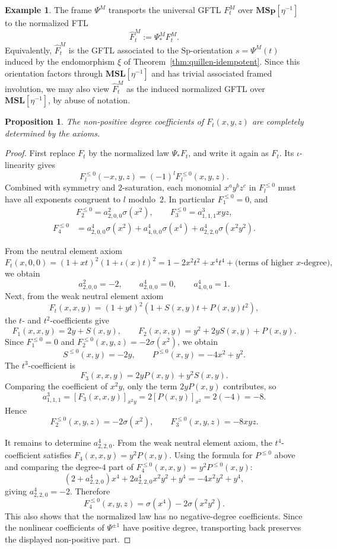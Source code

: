 \documentclass[a4paper]{amsart}
\theoremstyle{plain}
\newtheorem{proposition}[subsubsection]{Proposition}
\theoremstyle{definition}
\newtheorem{example}[subsubsection]{Example}
\newcommand{\Sp}{\mathrm{Sp}}
\newcommand{\MSp}{\mathbf{MSp}}
\newcommand{\MSL}{\mathbf{MSL}}
\newcommand{\etainv}{\eta^{-1}}
\newcommand{\MSpetainv}{{\MSp[\etainv]}}
\newcommand{\MSLetainv}{{\MSL[\etainv]}}
\renewcommand{\le}{\leqslant}
\begin{document}
\begin{example}
	The frame $\Psi^M$ transports the universal GFTL $F^M_t$ over $\MSpetainv$ to the normalized FTL
	\[
		\widehat{F}^M_t:=\Psi^M_*F^M_t.
	\]
	Equivalently, $\widehat{F}^M_t$ is the GFTL associated to the $\Sp$-orientation $s=\Psi^M(t)$ induced by the endomorphism $\xi$ of Theorem~\ref{thm:quillen-idempotent}. Since this orientation factors through $\MSLetainv$ and has trivial associated framed involution, we may also view $\widehat{F}^M_t$ as the induced normalized GFTL over $\MSLetainv$, by abuse of notation.
\end{example}
\begin{proposition}\label{prop:ftl-nonpositive-coefficients}
	The non-positive degree coefficients of $F_t(x,y,z)$ are completely determined by the axioms.
\end{proposition}
\begin{proof}
	First replace $F_t$ by the normalized law $\Psi_*F_t$, and write it again as $F_t$. Its $\iota$-linearity gives
	\[
		F_l^{\le 0}(-x,y,z)=(-1)^l F_l^{\le 0}(x,y,z).
	\]
	Combined with symmetry and $2$-saturation, each monomial $x^ay^bz^c$ in $F_l^{\le 0}$ must have all exponents congruent to $l$ modulo~$2$. In particular $F_1^{\le 0}=0$, and
	\[
		\begin{aligned}
			            & F_2^{\le 0}=a^2_{2,0,0}\sigma(x^2),\qquad
			F_3^{\le 0}=a^3_{1,1,1}xyz,                                                             \\
			F_4^{\le 0} & =a^4_{2,0,0}\sigma(x^2)+a^4_{4,0,0}\sigma(x^4)+a^4_{2,2,0}\sigma(x^2y^2).
		\end{aligned}
	\]

	From the neutral element axiom
	\[
		F_t(x,0,0)=(1+xt)^2(1+\iota(x)t)^2
		=1-2x^2t^2+x^4t^4+\text{(terms of higher $x$-degree)},
	\]
	we obtain
	\[
		a^2_{2,0,0}=-2,\qquad
		a^4_{2,0,0}=0,\qquad
		a^4_{4,0,0}=1.
	\]
	Next, from the weak neutral element axiom
	\[
		F_t(x,x,y)=(1+yt)^2(1+S(x,y)t+P(x,y)t^2),
	\]
	the $t$- and $t^2$-coefficients give
	\[
		F_1(x,x,y)=2y+S(x,y),\qquad
		F_2(x,x,y)=y^2+2yS(x,y)+P(x,y).
	\]
	Since $F_1^{\le 0}=0$ and $F_2^{\le 0}(x,y,z)=-2\sigma(x^2)$, we obtain
	\[
		S^{\le 0}(x,y)=-2y,\qquad
		P^{\le 0}(x,y)=-4x^2+y^2.
	\]
	The $t^3$-coefficient is
	\[
		F_3(x,x,y)=2yP(x,y)+y^2S(x,y).
	\]
	Comparing the coefficient of $x^2y$, only the term $2yP(x,y)$ contributes, so
	\[
		a^3_{1,1,1}=[F_3(x,x,y)]_{x^2y}=2[P(x,y)]_{x^2}=2(-4)=-8.
	\]
	Hence
	\[
		F_2^{\le 0}(x,y,z)=-2\sigma(x^2),\qquad
		F_3^{\le 0}(x,y,z)=-8xyz.
	\]

	It remains to determine $a^4_{2,2,0}$. From the weak neutral element axiom, the $t^4$-coefficient satisfies $F_4(x,x,y)=y^2P(x,y)$. Using the formula for $P^{\le 0}$ above and comparing the degree-$4$ part of $F_4^{\le 0}(x,x,y)=y^2P^{\le 0}(x,y)$:
	\[
		(2+a^4_{2,2,0})x^4+2a^4_{2,2,0}x^2y^2+y^4=-4x^2y^2+y^4,
	\]
	giving $a^4_{2,2,0}=-2$. Therefore
	\[
		F_4^{\le 0}(x,y,z)=\sigma(x^4)-2\sigma(x^2y^2).
	\]
	This also shows that the normalized law has no negative-degree coefficients. Since the nonlinear coefficients of $\Psi^{\pm1}$ have positive degree, transporting back preserves the displayed non-positive part.
\end{proof}
\end{document}

